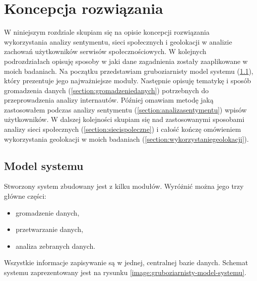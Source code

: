 \chapter{Koncepcja rozwiązania}
\label{chapter:koncepcjarozwiazania}

W niniejszym rozdziale skupiam się na opisie koncepcji rozwiązania wykorzystania
analizy sentymentu, sieci społecznych i geolokacji w analizie zachowań
użytkowników serwisów społecznościowych. W kolejnych podrozdziałach opisuję
sposoby w jaki dane zagadnienia zostały zaaplikowane w moich badaniach.
Na początku przedstawiam gruboziarnisty model systemu (\ref{section:modelsystemu}),
który prezentuje jego najważniejsze moduły. Następnie opisuję tematykę
i sposób gromadzenia danych (\ref{section:gromadzeniedanych}) potrzebnych do 
przeprowadzenia analizy internautów. Później omawiam metodę jaką zastosowałem 
podczas analizy sentymentu (\ref{section:analizasentymentu}) wpisów użytkowników.
W dalszej kolejności skupiam się nad zastosowanymi
sposobami analizy sieci społecznych (\ref{section:siecispoleczne})
i całość kończę omówieniem wykorzystania geolokacji w moich badaniach 
(\ref{section:wykorzystaniegeolokacji}).








\section{Model systemu}
\label{section:modelsystemu}
Stworzony system zbudowany jest z kilku modułów. Wyróżnić można jego
trzy główne części:
\begin{itemize}
  \item gromadzenie danych,
  \item przetwarzanie danych,
  \item analiza zebranych danych.
\end{itemize} 
Wszystkie informacje zapisywanie są w jednej, centralnej bazie danych.
Schemat systemu zaprezentowany jest na rysunku 
\ref{image:gruboziarnisty-model-systemu}.


\clearpage

